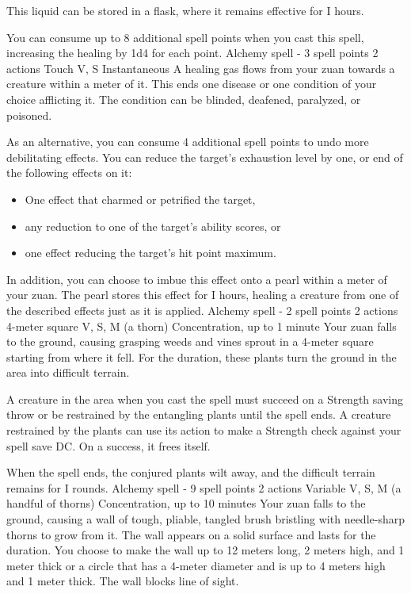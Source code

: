         This liquid can be stored in a flask, where it remains effective for I hours.

        You can consume up to 8 additional spell points when you cast this spell, increasing the healing by 1d4 for each point.
        {Alchemy spell - 3 spell points}
        {2 actions}
        {Touch}
        {V, S}
        {Instantaneous}
        A healing gas flows from your zuan towards a creature within a meter of it.
        This ends one disease or one condition of your choice afflicting it.
        The condition can be blinded, deafened, paralyzed, or poisoned.

        As an alternative, you can consume 4 additional spell points to undo more debilitating effects.
        You can reduce the target's exhaustion level by one, or end of the following effects on it:
        \begin{itemize}
            \item One effect that charmed or petrified the target,
            \item any reduction to one of the target's ability scores, or
            \item one effect reducing the target's hit point maximum.
        \end{itemize}

        In addition, you can choose to imbue this effect onto a pearl within a meter of your zuan.
        The pearl stores this effect for I hours, healing a creature from one of the described effects just as it is applied.
        {Alchemy spell - 2 spell points}
        {2 actions}
        {4-meter square}
        {V, S, M (a thorn)}
        {Concentration, up to 1 minute}
        Your zuan falls to the ground, causing grasping weeds and vines sprout in a 4-meter square starting from where it fell.
        For the duration, these plants turn the ground in the area into difficult terrain.

        A creature in the area when you cast the spell must succeed on a Strength saving throw or be restrained by the entangling plants until the spell ends.
        A creature restrained by the plants can use its action to make a Strength check against your spell save DC.
        On a success, it frees itself.

        When the spell ends, the conjured plants wilt away, and the difficult terrain remains for I rounds.
        {Alchemy spell - 9 spell points}
        {2 actions}
        {Variable}
        {V, S, M (a handful of thorns)}
        {Concentration, up to 10 minutes}
        Your zuan falls to the ground, causing a wall of tough, pliable, tangled brush bristling with needle-sharp thorns to grow from it.
        The wall appears on a solid surface and lasts for the duration.
        You choose to make the wall up to 12 meters long, 2 meters high, and 1 meter thick or a circle that has a 4-meter diameter and is up to 4 meters high and 1 meter thick.
        The wall blocks line of sight.

